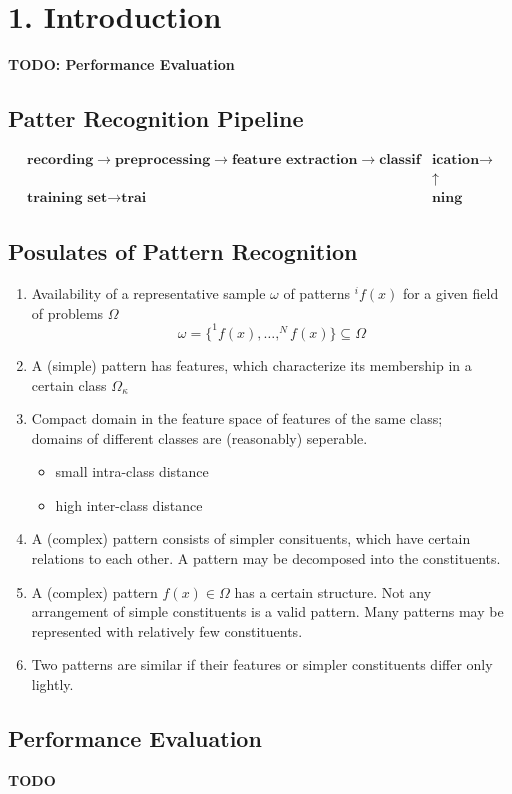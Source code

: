 \section*{1. Introduction}
\textbf{TODO: Performance Evaluation}
\subsection*{Patter Recognition Pipeline}
\begin{align*}
    \textbf{recording} \rightarrow \textbf{preprocessing} \rightarrow \textbf{feature extraction} \rightarrow \textbf{classif}& \textbf{ication} \rightarrow\\
    & \uparrow\\
    \textbf{training set} \rightarrow \textbf{trai} & \textbf{ning} 
\end{align*}

\subsection*{Posulates of Pattern Recognition}
\begin{enumerate}
    \item
        Availability of a representative sample $\omega$ of patterns $^if(x)$ for a given field of problems $\Omega$
        $$\omega = \{^1f(x),\dots,^Nf(x)\}\subseteq \Omega$$
    \item
        A (simple) pattern has features, which characterize its membership in a certain class $\Omega_{\kappa}$
    \item
        Compact domain in the feature space of features of the same class;\\ 
        domains of different classes are (reasonably) seperable.
        \begin{itemize}
            \item
                small intra-class distance
            \item
                high inter-class distance
        \end{itemize}
    \item
        A (complex) pattern consists of simpler consituents, which have certain relations to each other. A pattern may be decomposed into the constituents.
    \item
        A (complex) pattern $f(x) \in \Omega$ has a certain structure. Not any arrangement of simple constituents is a valid pattern. Many patterns may be represented with relatively few constituents.
    \item
        Two patterns are similar if their features or simpler constituents differ only lightly.
\end{enumerate}

\subsection*{Performance Evaluation}
    \textbf{TODO}
